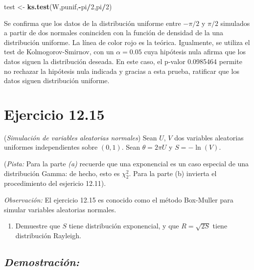 \documentclass[]{article}
\newenvironment{Shaded}{\begin{snugshade}}{\end{snugshade}}
\newcommand{\KeywordTok}[1]{\textcolor[rgb]{0.13,0.29,0.53}{\textbf{#1}}}
\newcommand{\DecValTok}[1]{\textcolor[rgb]{0.00,0.00,0.81}{#1}}
\newcommand{\StringTok}[1]{\textcolor[rgb]{0.31,0.60,0.02}{#1}}
\newcommand{\OperatorTok}[1]{\textcolor[rgb]{0.81,0.36,0.00}{\textbf{#1}}}
\newcommand{\NormalTok}[1]{#1}
\providecommand{\tightlist}{%
  \setlength{\itemsep}{0pt}\setlength{\parskip}{0pt}}
\begin{document}
\begin{Shaded}
\begin{Highlighting}[]
\NormalTok{test <-}\StringTok{ }\KeywordTok{ks.test}\NormalTok{(W,punif,}\OperatorTok{-}\NormalTok{pi}\OperatorTok{/}\DecValTok{2}\NormalTok{,pi}\OperatorTok{/}\DecValTok{2}\NormalTok{)}
\end{Highlighting}
\end{Shaded}

Se confirma que los datos de la distribución uniforme entre \(-\pi/2\) y
\(\pi/2\) simulados a partir de dos normales coninciden con la función
de densidad de la una distribución uniforme. La línea de color rojo es
la teórica. Igualmente, se utiliza el test de Kolmogorov-Smirnov, con un
\(\alpha=0.05\) cuya hipótesis nula afirma que los datos siguen la
distribución deseada. En este caso, el p-valor 0.0985464 permite no
rechazar la hipótesis nula indicada y gracias a esta prueba, ratificar
que los datos siguen distribución uniforme.

\newpage

\section{Ejercicio 12.15}\label{ejercicio-12.15}

(\emph{Simulación de variables aleatorias normales}) Sean \(U\), \(V\)
dos variables aleatorias uniformes independientes sobre \((0,1)\). Sean
\(\theta=2\pi U\) y \(S=-\ln(V)\).

(\emph{Pista:} Para la parte \emph{(a)} recuerde que una exponencial es
un caso especial de una distribución Gamma: de hecho, esto es
\(\chi_2^2\). Para la parte (b) invierta el procedimiento del esjericio
12.11).

\emph{Observación:} El ejercicio 12.15 es conocido como el método
Box-Muller para simular variables aleatorias normales.

\begin{enumerate}
\def\labelenumi{\alph{enumi}.}
\tightlist
\item
  Demuestre que \(S\) tiene distribución exponencial, y que
  \(R =\sqrt{2S}\) tiene distribución Rayleigh.
\end{enumerate}

\subsection{\texorpdfstring{\emph{Demostración:}}{Demostración:}}\label{demostracion-2}
\end{document}
